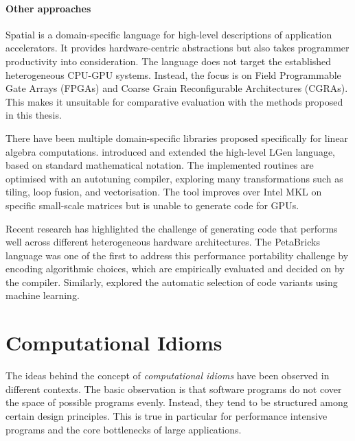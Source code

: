     \paragraph*{Other approaches}
    Spatial \citep{Koeplinger:2018:SLC:3192366.3192379} is a domain-specific
    language for high-level descriptions of application accelerators.
    It provides hardware-centric abstractions but also takes programmer
    productivity into consideration.
    The language does not target the established heterogeneous CPU-GPU
    systems.
    Instead, the focus is on  Field Programmable Gate Arrays (FPGAs) and
    Coarse Grain Reconfigurable Architectures (CGRAs).
    This makes it unsuitable for comparative evaluation with the methods
    proposed in this thesis.

    There have been multiple domain-specific libraries proposed specifically
    for linear algebra computations.
    \citet{Spampinato:2014:BLA:2581122.2544155,
    Spampinato:2016:BLA:2854038.2854060} introduced and extended the high-level
    LGen language, based on standard mathematical notation.
    The implemented routines are optimised with an autotuning compiler,
    exploring many transformations such as tiling, loop fusion, and
    vectorisation.
    The tool improves over Intel MKL on specific small-scale matrices but is
    unable to generate code for GPUs.

    Recent research has highlighted the challenge of generating code that
    performs well across different heterogeneous hardware architectures.
    The PetaBricks language
    \citep{Ansel:2009:PLC:1542476.1542481,PhothilimthanaARA13} was
    one of the first to address this performance portability challenge
    by encoding algorithmic choices, which are empirically evaluated and decided
    on by the compiler.
    Similarly, \citet{MuralidharanRHG16} explored the automatic selection of
    code variants using machine learning.

\section{Computational Idioms}

    The ideas behind the concept of {\it computational idioms} have been
    observed in different contexts.
    The basic observation is that software programs do not cover the
    space of possible programs evenly.
    Instead, they tend to be structured among certain design principles.
    This is true in particular for performance intensive programs and the
    core bottlenecks of large applications.

